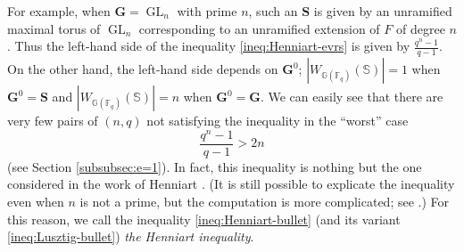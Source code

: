 \documentclass{amsart}
\newcommand{\F}{\mathbb{F}}
\newcommand{\bbS}{\mathbb{S}}
\newcommand{\bbG}{\mathbb{G}}
\newcommand{\bfG}{\mathbf{G}}
\newcommand{\bfS}{\mathbf{S}}
\DeclareMathOperator{\GL}{GL}
\theoremstyle{plain}
\theoremstyle{definition}
\theoremstyle{remark}
\theoremstyle{theorem}
\begin{document}
For example, when $\bfG=\GL_{n}$ with prime $n$, such an $\bfS$ is given by an unramified maximal torus of $\GL_{n}$ corresponding to an unramified extension of $F$ of degree $n$.
Thus the left-hand side of the inequality \eqref{ineq:Henniart-evrs} is given by $\frac{q^{n}-1}{q-1}$.
On the other hand, the left-hand side depends on $\bfG^{0}$; $|W_{\bbG(\F_{q})}(\bbS)|=1$ when $\bfG^{0}=\bfS$ and $|W_{\bbG(\F_{q})}(\bbS)|=n$ when $\bfG^{0}=\bfG$.
We can easily see that there are very few pairs of $(n,q)$ not satisfying the inequality in the ``worst'' case
\[
\frac{q^{n}-1}{q-1}>2n
\]
 (see Section \ref{subsubsec:e=1}).
In fact, this inequality is nothing but the one considered in the work of Henniart \cite{Hen92}.
(It is still possible to explicate the inequality even when $n$ is not a prime, but the computation is more complicated; see \cite[Section 2.7]{Hen92}.)
For this reason, we call the inequality \eqref{ineq:Henniart-bullet} (and its variant \eqref{ineq:Lusztig-bullet}) \textit{the Henniart inequality}.
\end{document}
